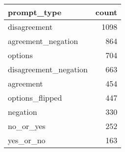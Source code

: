 \begin{tabular}{lr}
\toprule
prompt\_type & count \\
\midrule
disagreement & 1098 \\
agreement\_negation & 864 \\
options & 704 \\
disagreement\_negation & 663 \\
agreement & 454 \\
options\_flipped & 447 \\
negation & 330 \\
no\_or\_yes & 252 \\
yes\_or\_no & 163 \\
\bottomrule
\end{tabular}
